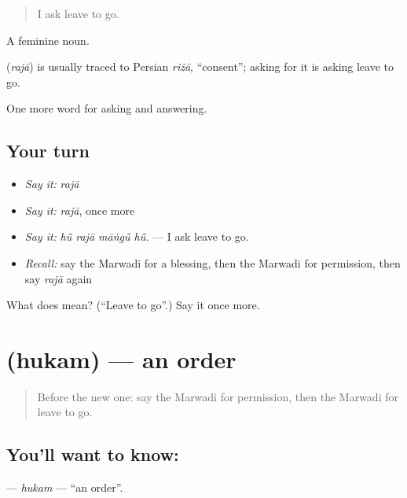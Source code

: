 \begin{quote}
I ask leave to go.
\end{quote}

A feminine noun.

\begin{cousinweb}
\textbf{} (\emph{rajā}) is usually traced to Persian \emph{riżā}, \textquotedblleft{}consent\textquotedblright{}; asking for it is asking leave to go.
\end{cousinweb}

\begin{grammarlens}[title={What you've built}]
One more word for asking and answering.
\end{grammarlens}

\subsection*{Your turn}
\begin{itemize}
\raggedright
  \item \emph{Say it:} \emph{rajā}
  \item \emph{Say it:} \emph{rajā}, once more
  \item \emph{Say it:} \emph{hū̃ rajā māṅgū̃ hū̃.} — I ask leave to go.
  \item \emph{Recall:} say the Marwadi for a blessing, then the Marwadi for permission, then say \emph{rajā} again
\end{itemize}

\begin{tcolorbox}[breakable,colback=teal!4,colframe=teal!35!black,title={Before you move on}]
What does  mean? (\textquotedblleft{}Leave to go\textquotedblright{}.) Say it once more.
\end{tcolorbox}
\section[\texorpdfstring{\mw{हुकम} (hukam)}{हुकम (hukam)}]{ (hukam) — an order}

\label{lesson:MW-C267-hukam}



\begin{quote}
Before the new one: say the Marwadi for permission, then the Marwadi for leave to go.
\end{quote}

\subsection*{You'll want to know: }
\textbf{} — \emph{hukam} — \textquotedblleft{}an order\textquotedblright{}.

